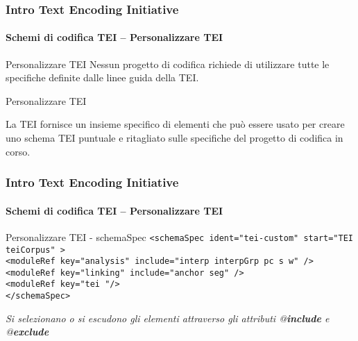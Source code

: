 \begin{frame}
	\frametitle{Intro Text Encoding Initiative}
	\framesubtitle{Schemi di codifica TEI – Personalizzare TEI}
	\addtocounter{nframe}{1}

    \begin{block}{Personalizzare TEI}
        Nessun progetto di codifica richiede di utilizzare tutte le specifiche definite dalle linee guida della TEI.
    \end{block}
    \begin{block}{Personalizzare TEI}
        
        La TEI fornisce un insieme specifico di elementi che può essere usato per creare uno schema TEI puntuale e ritagliato sulle specifiche del progetto di codifica in corso.

    \end{block}
    
\end{frame}



    



\begin{frame}
	\frametitle{Intro Text Encoding Initiative}
	\framesubtitle{Schemi di codifica TEI – Personalizzare TEI}
    \addtocounter{nframe}{1}
    
    \begin{block}{Personalizzare TEI - schemaSpec}
        \texttt{<schemaSpec ident="tei-custom" start="TEI teiCorpus" >}
        \\\texttt{<moduleRef key="analysis" include="interp interpGrp pc s w" />}
        \\\texttt{<moduleRef key="linking" include="anchor seg" />}
        \\\texttt{<moduleRef key="tei "/> }
        \\\texttt{</schemaSpec>}
    \end{block}
    \textit{Si selezionano o si escudono gli elementi attraverso gli attributi @\textbf{include} e @\textbf{exclude}}
\end{frame}

